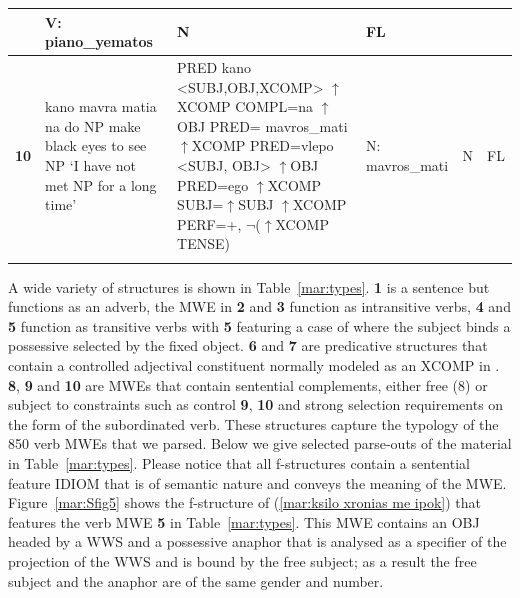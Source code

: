 \documentclass[output=paper]{langsci/langscibook}
\begin{document}
\begin{table}[htbp]
{\begin{tabular}{l@{~}p{5.6cm}p{6.4cm}p{3.3cm}ll}
  &
  V: \newline
  piano\_yematos
  &
  N
  &
  FL
  \\
  \hline
  \textbf{10}
  &
  kano mavra matia na do NP \newline
  make black eyes to see NP \newline
  `I have not met NP for a long time’
  &
  PRED kano <SUBJ,OBJ,XCOMP> \newline
  $\uparrow$XCOMP COMPL=na \newline
  $\uparrow$OBJ PRED= mavros\_mati \newline
  $\uparrow$XCOMP PRED=vlepo <SUBJ, OBJ> \newline
  $\uparrow$OBJ PRED=ego \newline
  $\uparrow$XCOMP SUBJ=$\uparrow$SUBJ \newline
  $\uparrow$XCOMP PERF=+, $\neg$($\uparrow$XCOMP TENSE)
  &
  N: \newline
  mavros\_mati
  &
  N
  & 
  FL
  \tabularnewline
  \lspbottomrule
\end{tabular}
}
\end{table}
A wide variety of structures is shown in Table~\ref{mar:types}. \textbf{1} is a sentence but functions as an adverb, the MWE in \textbf{2} and \textbf{3} function as intransitive verbs, \textbf{4} and \textbf{5} function as transitive verbs with \textbf{5} featuring a case of where the subject binds a possessive selected by the fixed object. \textbf{6} and \textbf{7} are predicative structures that contain a controlled adjectival constituent normally modeled as an XCOMP in . \textbf{8}, \textbf{9} and \textbf{10} are MWEs that contain sentential complements, either free (8) or subject to constraints such as control \textbf{9}, \textbf{10} and strong selection requirements on the form of the subordinated verb. These structures capture the typology of the 850 verb MWEs that we parsed. 
Below we give selected parse-outs of the material in Table~\ref{mar:types}. Please notice that all f-structures contain a sentential feature IDIOM that is of semantic nature and conveys the meaning of the MWE.
Figure~\ref{mar:Sfig5} shows the f-structure of (\ref{mar:ksilo xronias me ipok}) that features the verb MWE \textbf{5} in Table~\ref{mar:types}. This MWE contains an OBJ  headed by a WWS and a possessive anaphor that is analysed as a specifier of  the projection of the WWS and is bound by the free subject; as a result the free subject and the anaphor are of the same gender and number.  
\end{document}
